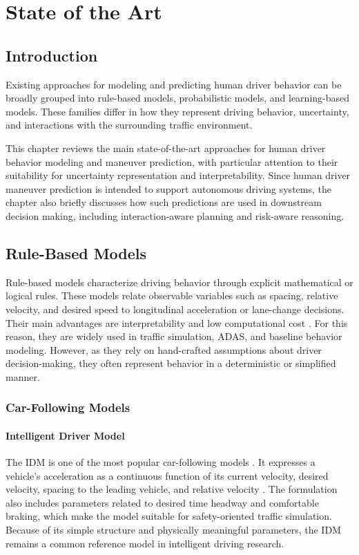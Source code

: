 \chapter{State of the Art}

\section{Introduction}
Existing approaches for modeling and predicting human driver behavior can be broadly grouped into rule-based models, probabilistic models, and learning-based models. 
These families differ in how they represent driving behavior, uncertainty, and interactions with the surrounding traffic environment. 

\par This chapter reviews the main state-of-the-art approaches for human driver behavior modeling and maneuver prediction, with particular attention to their suitability 
for uncertainty representation and interpretability. Since human driver maneuver prediction is intended to support autonomous driving systems, 
the chapter also briefly discusses how such predictions are used in downstream decision making, including interaction-aware planning and risk-aware reasoning.


\section{Rule-Based Models}
Rule-based models characterize driving behavior through explicit mathematical or logical rules. 
These models relate observable variables such as spacing, relative velocity, and desired speed to longitudinal acceleration or lane-change decisions. 
Their main advantages are interpretability and low computational cost \cite{zhou2025}. For this reason, they are widely used in traffic simulation, 
\ac{ADAS}, and baseline behavior modeling.  
However, as they rely on hand-crafted assumptions about driver decision-making, they often represent behavior in a deterministic or simplified manner. 

\subsection{Car-Following Models}
\subsubsection{Intelligent Driver Model}
The \ac{IDM} is one of the most popular car-following models \cite{zhou2025}. 
It expresses a vehicle's acceleration as a continuous function of its current velocity, 
desired velocity, spacing to the leading vehicle, and relative velocity \cite{PhysRevE.62.1805}. The formulation also includes parameters related to desired time headway and comfortable 
braking, which make the model suitable for safety-oriented traffic simulation. 
Because of its simple structure and physically meaningful parameters, the \ac{IDM} remains a common reference model in intelligent driving research.
